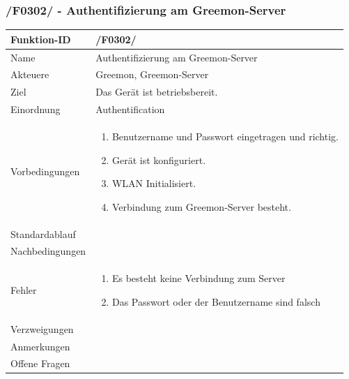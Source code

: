 \documentclass[pointlessnumbers]{scrartcl}
\begin{document}
 \subsubsection{/F0302/ - Authentifizierung am Greemon-Server}
 \begin{tabular}{|p{\BreiteErsterTab}|p{\BreiteZweiterTab}|}\hline
    Funktion-ID &        /F0302/  
                        \\ \hline
    Name &               Authentifizierung am Greemon-Server
                        \\ \hline
    Akteuere &           Greemon, Greemon-Server
                        \\ \hline
    Ziel &               Das Gerät ist betriebsbereit. 
                        \\ \hline
    Einordnung &        Authentification 
                        \\ \hline
    Vorbedingungen &    \begin{enumerate}
                            \item Benutzername und Passwort eingetragen und richtig.
                            \item Gerät ist konfiguriert.
                            \item WLAN Initialisiert.
                            \item Verbindung zum Greemon-Server besteht. 
                        \end{enumerate}
                        \\ \hline
    Standardablauf &    
                        \\ \hline
    Nachbedingungen &   
                        \\ \hline
    Fehler &            \begin{enumerate}
                        \item Es besteht keine Verbindung zum Server 
                        \item Das Passwort oder der Benutzername sind falsch
                        \end{enumerate}
                        \\ \hline
    Verzweigungen &     
                        \\ \hline
    Anmerkungen &       
                        \\ \hline
    Offene Fragen &     
                        \\ \hline
 \end{tabular} 
 
\end{document}
